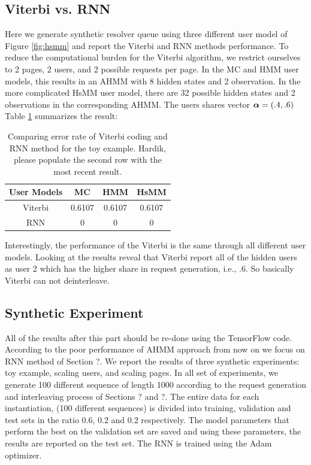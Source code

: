 	\subsection{Viterbi vs. RNN}
	\label{subsec:viterbi}
	Here we generate synthetic resolver queue using three different user model of Figure \ref{fig:hsmm} and report the Viterbi and RNN methods performance. 
	To reduce the computational burden for the Viterbi algorithm, we restrict ourselves to 2 pages, 2 users, and 2 possible requests per page. 
	In the MC and HMM user models, this results in an AHMM with 8 hidden states and 2 observation. 
	In the more complicated HsMM user model, there are 32 possible hidden states and 2 observations in the corresponding AHMM. 
	The users shares vector $\boldsymbol{\alpha} = (.4, .6)$
	Table \ref{tab:viterbi} summarizes the result:
	\begin{table}
		\scriptsize  
		\centering
		\begin{tabular}{|c|c|c|c|}
			\hline
			{\bf User Models} & MC & HMM & HsMM \\ 
			\hline  
			Viterbi
			&  0.6107 	& 0.6107	&  0.6107  \\ \hline 
			RNN
			&  0 	& 0		&  0  \\ \hline 
		\end{tabular}
		\caption{Comparing error rate of Viterbi coding and RNN method for the toy example. {\color{red} Hardik, please populate the second row with the most recent result.}}
		\label{tab:viterbi}
	\end{table}
	Interestingly, the performance of the Viterbi is the same through all different user models. 
	Looking at the results reveal that Viterbi report all of the hidden users as user 2 which has the higher share in request generation, i.e., $.6$. 
	So basically Viterbi can not deinterleave. 
	
	\subsection{Synthetic Experiment}
	\label{subsec:synthetic}
	{\color{red} All of the results after this part should be re-done using the TensorFlow code.}
	According to the poor performance of AHMM approach from now on we focus on RNN method of Section ?.
	We report the results of three synthetic experiments: toy example, scaling users, and scaling pages.
	In all set of experiments, we generate 100 different sequence of length 1000 according to the request generation and interleaving process of Sections ? and ?.
	The entire data for each instantiation, (100 different sequences) is divided into training, validation and test sets in the ratio 0.6, 0.2 and 0.2 respectively. 
	The model parameters that perform the best on the validation set are saved and using these parameters, the results are reported on the test set. 
	The RNN is trained using the Adam optimizer.
	
